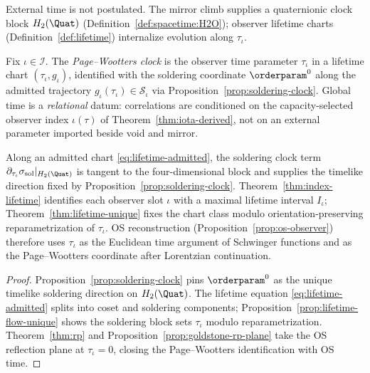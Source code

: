 External time is not postulated. The mirror climb supplies a quaternionic clock
block $H_2(\Quat)$ (Definition~\ref{def:spacetime:H2O}); observer lifetime
charts (Definition~\ref{def:lifetime}) internalize evolution along
$\tau_\iota$.

\begin{definition}\label{def:page-wootters}
Fix $\iota\in\mathcal{I}$. The \emph{Page--Wootters clock} is the observer
time parameter $\tau_\iota$ in a lifetime chart $(\tau_\iota,g_\iota)$,
identified with the soldering coordinate $\orderparam^0$ along the admitted
trajectory $g_\iota(\tau_\iota)\in\mathcal{S}_\iota$ via
Proposition~\ref{prop:soldering-clock}. Global time is a \emph{relational}
datum: correlations are conditioned on the capacity-selected observer index
$\iota(\tau)$ of Theorem~\ref{thm:iota-derived}, not on an external
parameter imported beside void and mirror.
\end{definition}

\begin{proposition}
\label{prop:page-wootters-derived}
Along an admitted chart \eqref{eq:lifetime-admitted}, the soldering clock term
$\partial_{\tau_\iota}\sigma_{\mathrm{sol}}|_{H_2(\Quat)}$ is tangent to the
four-dimensional block and supplies the timelike direction fixed by
Proposition~\ref{prop:soldering-clock}. Theorem~\ref{thm:index-lifetime}
identifies each observer slot $\iota$ with a maximal lifetime interval
$I_\iota$; Theorem~\ref{thm:lifetime-unique} fixes the chart class modulo
orientation-preserving reparametrization of $\tau_\iota$. OS reconstruction
(Proposition~\ref{prop:os-observer}) therefore uses $\tau_\iota$ as the
Euclidean time argument of Schwinger functions and as the Page--Wootters
coordinate after Lorentzian continuation.
\end{proposition}

\begin{proof}
Proposition~\ref{prop:soldering-clock} pins $\orderparam^0$ as the unique
timelike soldering direction on $H_2(\Quat)$. The lifetime equation
\eqref{eq:lifetime-admitted} splits into coset and soldering components;
Proposition~\ref{prop:lifetime-flow-unique} shows the soldering block sets
$\tau_\iota$ modulo reparametrization. Theorem~\ref{thm:rp} and
Proposition~\ref{prop:goldstone-rp-plane} take the OS reflection plane at
$\tau_\iota=0$, closing the Page--Wootters identification with OS time.
\end{proof}

